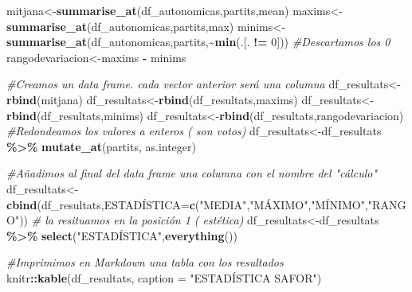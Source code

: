 \documentclass[
]{article}
\newenvironment{Shaded}{\begin{snugshade}}{\end{snugshade}}
\newcommand{\AttributeTok}[1]{\textcolor[rgb]{0.13,0.29,0.53}{#1}}
\newcommand{\CommentTok}[1]{\textcolor[rgb]{0.56,0.35,0.01}{\textit{#1}}}
\newcommand{\DecValTok}[1]{\textcolor[rgb]{0.00,0.00,0.81}{#1}}
\newcommand{\FunctionTok}[1]{\textcolor[rgb]{0.13,0.29,0.53}{\textbf{#1}}}
\newcommand{\NormalTok}[1]{#1}
\newcommand{\OtherTok}[1]{\textcolor[rgb]{0.56,0.35,0.01}{#1}}
\newcommand{\SpecialCharTok}[1]{\textcolor[rgb]{0.81,0.36,0.00}{\textbf{#1}}}
\newcommand{\StringTok}[1]{\textcolor[rgb]{0.31,0.60,0.02}{#1}}
\begin{document}
\begin{Shaded}
\begin{Highlighting}[]
\NormalTok{mitjana}\OtherTok{\textless{}{-}}\FunctionTok{summarise\_at}\NormalTok{(df\_autonomicas,partits,mean)}
\NormalTok{maxims}\OtherTok{\textless{}{-}}\FunctionTok{summarise\_at}\NormalTok{(df\_autonomicas,partits,max)}
\NormalTok{minims}\OtherTok{\textless{}{-}}\FunctionTok{summarise\_at}\NormalTok{(df\_autonomicas,partits,}\SpecialCharTok{\textasciitilde{}}\FunctionTok{min}\NormalTok{(.[. }\SpecialCharTok{!=} \DecValTok{0}\NormalTok{])) }\CommentTok{\#Descartamos los 0}
\NormalTok{rangodevariacion}\OtherTok{\textless{}{-}}\NormalTok{maxims }\SpecialCharTok{{-}}\NormalTok{ minims}

\CommentTok{\#Creamos un data frame. cada vector anterior será una columna}
\NormalTok{df\_resultats}\OtherTok{\textless{}{-}}\FunctionTok{rbind}\NormalTok{(mitjana)}
\NormalTok{df\_resultats}\OtherTok{\textless{}{-}}\FunctionTok{rbind}\NormalTok{(df\_resultats,maxims)}
\NormalTok{df\_resultats}\OtherTok{\textless{}{-}}\FunctionTok{rbind}\NormalTok{(df\_resultats,minims)}
\NormalTok{df\_resultats}\OtherTok{\textless{}{-}}\FunctionTok{rbind}\NormalTok{(df\_resultats,rangodevariacion)}
\CommentTok{\#Redondeamos los valores a enteros ( son votos) }
\NormalTok{df\_resultats}\OtherTok{\textless{}{-}}\NormalTok{df\_resultats }\SpecialCharTok{\%\textgreater{}\%} \FunctionTok{mutate\_at}\NormalTok{(partits, as.integer)}

\CommentTok{\#Añadimos al final del data frame una columna con el nombre del "cálculo"}
\NormalTok{df\_resultats}\OtherTok{\textless{}{-}}\FunctionTok{cbind}\NormalTok{(df\_resultats,ESTADÍSTICA}\OtherTok{=}\FunctionTok{c}\NormalTok{(}\StringTok{"MEDIA"}\NormalTok{,}\StringTok{"MÁXIMO"}\NormalTok{,}\StringTok{"MÍNIMO"}\NormalTok{,}\StringTok{"RANGO"}\NormalTok{))}
\CommentTok{\# la resituamos en la posición 1 ( estética)}
\NormalTok{df\_resultats}\OtherTok{\textless{}{-}}\NormalTok{df\_resultats }\SpecialCharTok{\%\textgreater{}\%} \FunctionTok{select}\NormalTok{(}\StringTok{"ESTADÍSTICA"}\NormalTok{,}\FunctionTok{everything}\NormalTok{())}

\CommentTok{\#Imprimimos en Markdown una tabla con los resultados}
\NormalTok{knitr}\SpecialCharTok{::}\FunctionTok{kable}\NormalTok{(df\_resultats, }\AttributeTok{caption =} \StringTok{"ESTADÍSTICA SAFOR"}\NormalTok{)}
\end{Highlighting}
\end{Shaded}
\end{document}
